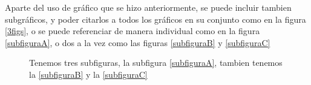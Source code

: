 \documentclass[a4paper]{IEEEtran} %
\begin{document}
Aparte del uso de gráfico que se hizo anteriormente, se puede incluir tambien subgráficos, y poder citarlos a todos los gráficos en su conjunto como en la figura \eqref{3figs}, o se puede referenciar de manera individual como en la figura \eqref{subfiguraA}, o dos a la vez como las figuras \eqref{subfiguraB} y \eqref{subfiguraC}

\begin{figure}%
\centering
{}
\caption{Tenemos tres subfiguras, la subfigura \ref{subfiguraA}, tambien tenemos la \ref{subfiguraB} y la \ref{subfiguraC}}
\label{3figs}
\end{figure}
\end{document}
